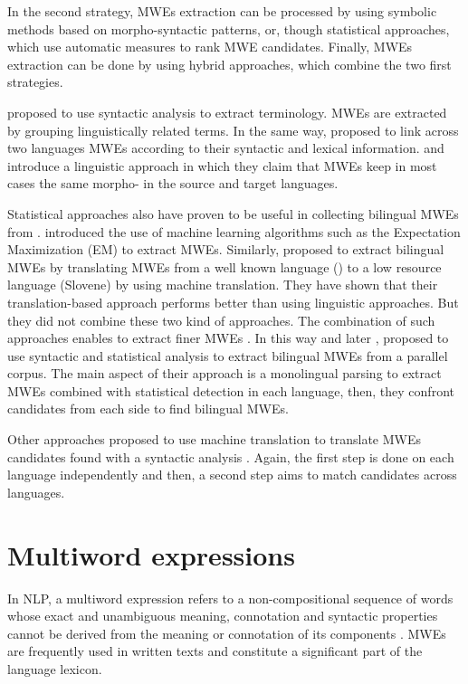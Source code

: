 \documentclass[output=paper,modfonts,nonflat]{langsci/langscibook}
\begin{document}
In the second strategy, MWEs extraction can be processed by using symbolic methods based on morpho-syntactic patterns, or, though statistical approaches, which use automatic measures to rank MWE candidates. Finally, MWEs extraction can be done by using hybrid approaches, which combine the two first strategies.

\cite{dagan1994termight} proposed to use syntactic analysis to extract terminology. MWEs are extracted by grouping linguistically related terms. In the same way, \cite{okita2010multi} proposed to link across two languages MWEs according to their syntactic and lexical information. \cite{tufis2007parallel} and \cite{seretan2007collocation} introduce a linguistic approach in which they claim that MWEs keep in most cases the same morpho- in the source and target languages.

Statistical approaches also have proven to be useful in collecting bilingual MWEs from . \cite{kupiec1993algorithm} introduced the use of machine learning algorithms such as the Expectation Maximization (EM) to extract MWEs. Similarly, \cite{vintar2008harvesting} proposed to extract bilingual MWEs by translating MWEs from a well known language () to a low resource language (Slovene) by using machine translation. They have shown that their translation-based approach performs better than using linguistic approaches. But they did not combine these two kind of approaches. The combination of such approaches enables to extract finer MWEs \citep{daille2001extraction}. In this way \cite{wu2003bilingual} and later \cite{boulaknadel2008multiterm}, proposed to use syntactic and statistical analysis to extract bilingual MWEs from a parallel corpus. The main aspect of their approach is a monolingual parsing to extract MWEs combined with statistical detection in each language, then, they confront candidates from each side to find bilingual MWEs.

Other approaches proposed to use machine translation to translate MWEs candidates found with a syntactic analysis \citep{seretan2007collocation}. Again, the first step is done on each language independently and then, a second step aims to match candidates across languages.

\section{Multiword expressions}
In NLP, a multiword expression  refers to a non-composi\-tional sequence of words whose exact and unambiguous meaning, connotation and syntactic properties cannot be derived from the meaning or connotation of its components \citep{choueka1988looking,sag02}.
MWEs are frequently used in written texts and constitute a significant part of the language lexicon.
\end{document}
